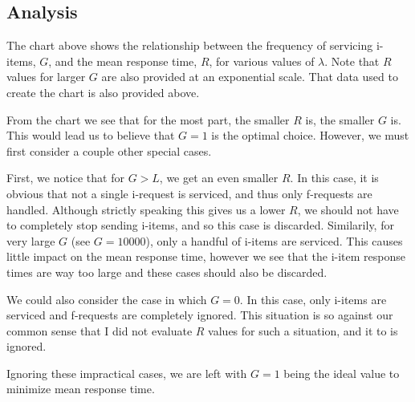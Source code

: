 \documentclass[12pt]{article}
\begin{document}
\subsection{Analysis}
The chart above shows the relationship between the frequency of servicing
i-items, $G$, and the mean response time, $R$, for various values of $\lambda$.
Note that $R$ values for larger $G$ are also provided at an exponential scale.
That data used to create the chart is also provided above.

From the chart we see that for the most part, the smaller $R$ is, the smaller
$G$ is.  This would lead us to believe that $G=1$ is the optimal choice.
However, we must first consider a couple other special cases.

First, we notice that for $G > L$, we get an even smaller $R$.  In this case, it
is obvious that not a single i-request is serviced, and thus only f-requests are
handled.  Although strictly speaking this gives us a lower $R$, we should not
have to completely stop sending i-items, and so this case is discarded.
Similarily, for very large $G$ (see $G=10000$), only a handful of i-items are
serviced.  This causes little impact on the mean response time, however we see
that the i-item response times are way too large and these cases should also be
discarded.

We could also consider the case in which $G=0$.  In this case, only i-items are
serviced and f-requests are completely ignored.  This situation is so against
our common sense that I did not evaluate $R$ values for such a situation, and it
to is ignored.

Ignoring these impractical cases, we are left with $G=1$ being the ideal value
to minimize mean response time.
\end{document}
